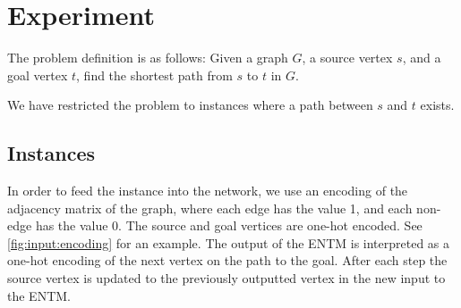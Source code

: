 
\section{Experiment}
The problem definition is as follows: 
Given a graph $G$, a source vertex $s$, and a goal vertex $t$, find the shortest path from $s$ to $t$ in $G$.

\newpar We have restricted the problem to instances where a path between $s$ and $t$ exists.

\subsection{Instances}
In order to feed the instance into the network, we use an encoding of the adjacency matrix of the graph, where each edge has the value 1, and each non-edge has the value 0. The source and goal vertices are one-hot encoded. See \autoref{fig:input:encoding} for an example. The output of the ENTM is interpreted as a one-hot encoding of the next vertex on the path to the goal. After each step the source vertex is updated to the previously outputted vertex in the new input to the ENTM.

